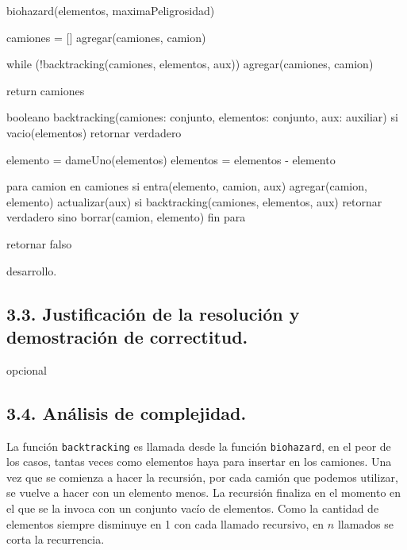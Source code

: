 biohazard(elementos, maximaPeligrosidad) {
  camiones = []
  agregar(camiones, camion)
  
  while (!backtracking(camiones, elementos, aux)) {
    agregar(camiones, camion)
  }
  
  return camiones
}

booleano backtracking(camiones: conjunto, elementos: conjunto, aux: auxiliar)
  si vacio(elementos)
    retornar verdadero
  
  elemento = dameUno(elementos)
  elementos = elementos - elemento
  
  para camion en camiones
    si entra(elemento, camion, aux)
      agregar(camion, elemento)
      actualizar(aux)
      si backtracking(camiones, elementos, aux)
        retornar verdadero
      sino
        borrar(camion, elemento)
  fin para
  
  retornar falso


 
\vspace*{0.3cm}

desarrollo.


\vspace*{0.75cm} \noindent





\subsection{3.3. Justificación de la resolución y demostración de correctitud.}

\vspace*{0.3cm}


opcional


\vspace*{0.75cm} \noindent





\subsection{3.4. Análisis de complejidad.}

\vspace*{0.3cm}


La función \verb|backtracking| es llamada desde la función \verb|biohazard|, en
el peor de los casos, tantas veces como elementos haya para insertar en los camiones.
Una vez que se comienza a hacer la recursión, por cada camión que podemos utilizar,
se vuelve a hacer con un elemento menos. La recursión finaliza en el momento en 
el que se la invoca con un conjunto vacío de elementos. Como la cantidad de 
elementos siempre disminuye en 1 con cada llamado recursivo, en $n$ llamados se
corta la recurrencia.

